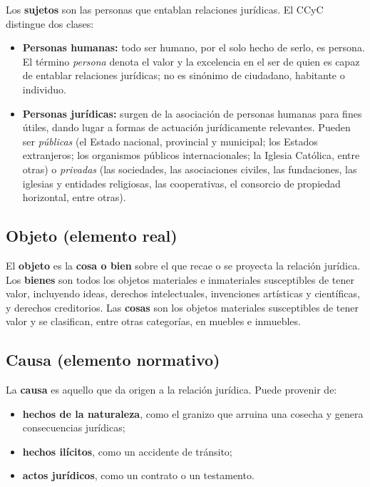 \documentclass[12pt,oneside]{book}
\begin{document}
Los \textbf{sujetos} son las personas que entablan relaciones jurídicas. El CCyC distingue dos clases:

\begin{itemize}
\item \textbf{Personas humanas:} todo ser humano, por el solo hecho de serlo, es persona. El término \textit{persona} denota el valor y la excelencia en el ser de quien es capaz de entablar relaciones jurídicas; no es sinónimo de ciudadano, habitante o individuo.
\item \textbf{Personas jurídicas:} surgen de la asociación de personas humanas para fines útiles, dando lugar a formas de actuación jurídicamente relevantes. Pueden ser \textit{públicas} (el Estado nacional, provincial y municipal; los Estados extranjeros; los organismos públicos internacionales; la Iglesia Católica, entre otras) o \textit{privadas} (las sociedades, las asociaciones civiles, las fundaciones, las iglesias y entidades religiosas, las cooperativas, el consorcio de propiedad horizontal, entre otras).
\end{itemize}

\subsection{Objeto (elemento real)}

El \textbf{objeto} es la \textbf{cosa o bien} sobre el que recae o se proyecta la relación jurídica. Los \textbf{bienes} son todos los objetos materiales e inmateriales susceptibles de tener valor, incluyendo ideas, derechos intelectuales, invenciones artísticas y científicas, y derechos creditorios. Las \textbf{cosas} son los objetos materiales susceptibles de tener valor y se clasifican, entre otras categorías, en muebles e inmuebles.

\subsection{Causa (elemento normativo)}

La \textbf{causa} es aquello que da origen a la relación jurídica. Puede provenir de:

\begin{itemize}
\item \textbf{hechos de la naturaleza}, como el granizo que arruina una cosecha y genera consecuencias jurídicas;
\item \textbf{hechos ilícitos}, como un accidente de tránsito;
\item \textbf{actos jurídicos}, como un contrato o un testamento.
\end{itemize}
\end{document}
